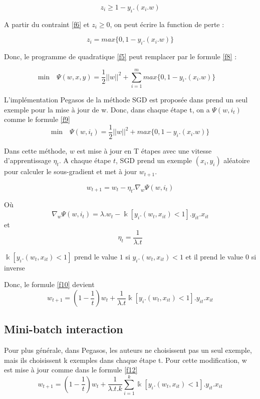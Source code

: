 \begin{equation}
z_i \geq 1 - y_i.(x_i.w)
\label{f6}
\end{equation}

A partir du contraint \ref{f6} et $z_i \geq 0$, on peut écrire la function de perte :

\begin{equation}
z_i = max\lbrace0, 1 - y_i.(x_i.w)\rbrace
\label{f7}
\end{equation}

Donc, le programme de quadratique \ref{f5} peut remplacer par le formule \ref{f8} :

\begin{equation}
\mbox{min}\quad \Psi(w, x, y) = \frac{1}{2} ||w||^2 + \sum\limits_{i=1}^m max\lbrace0, 1 - y_i.(x_i.w)\rbrace\quad
\label{f8}
\end{equation}

L'implémentation Pegasos de la méthode SGD est proposée dans \cite{sss07} prend un seul exemple pour la mise à jour de w. Donc, dans chaque étape t, on a $\Psi(w, i_t)$ comme le formule \ref{f9}
\begin{equation}
\mbox{min}\quad \Psi(w, i_t) = \frac{1}{2} ||w||^2 + max\lbrace0, 1 - y_i.(x_i.w)\rbrace
\label{f9}
\end{equation}

Dans cette méthode, $w$ est mise à jour en T étapes avec une vitesse d'apprentissage $\eta_t$. A chaque étape $t$, SGD prend un exemple $(x_i, y_i)$ aléatoire pour calculer le sous-gradient et met à jour $w_{t+1}$.

\begin{equation}
w_{t+1} = w_t - \eta_t.\nabla_w{\Psi(w, i_t)}
\label{f10}
\end{equation}

Où 
\[
\nabla_w{\Psi(w, i_t)} = \lambda.w_t  - \Bbbk[y_i.(w_t,x_{it}) < 1].y_{it}.x_{it}
\]
et
\[
\eta_t = \frac{1}{\lambda.t}
\]

$\Bbbk[y_i.(w_t,x_{it}) < 1]$ prend le value $1$ si $y_i.(w_t,x_{it}) < 1$ et il prend le value $0$ si inverse

Donc, le formule \ref{f10} devient
\begin{equation}
w_{t+1} = (1 - \frac{1}{t})w_t + \frac{1}{\lambda.t} \Bbbk[y_i.(w_t,x_{it}) < 1].y_{it}.x_{it}
\label{f11}
\end{equation}

\subsection{Mini-batch interaction}
Pour plus générale, dans Pegasos, les auteurs ne choisissent pas un seul exemple, mais ils choisissent k exemples dans chaque étape t. Pour cette modification, w est mise à jour comme dans le formule \ref{f12}
\begin{equation}
w_{t+1} = (1 - \frac{1}{t})w_t + \frac{1}{\lambda.t.k}\sum\limits_{i=1}^k \Bbbk[y_i.(w_t,x_{it}) < 1].y_{it}.x_{it}
\label{f12}
\end{equation}


